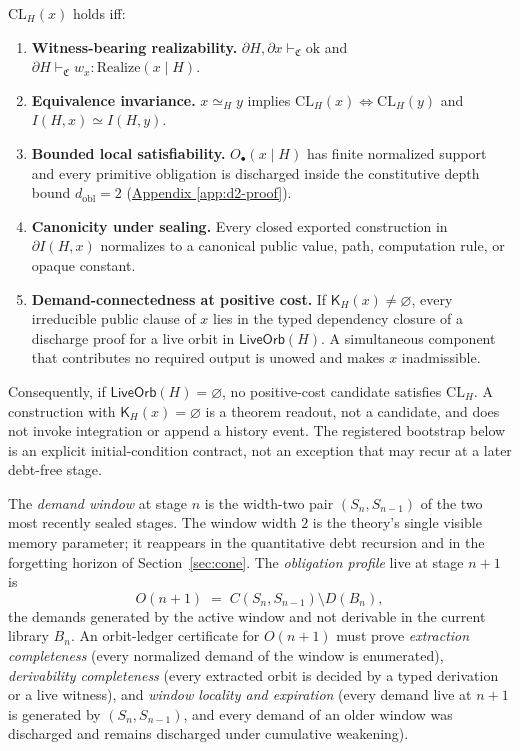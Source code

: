 \begin{definition}
\(\mathrm{CL}_H(x)\) holds iff:
\begin{enumerate}[leftmargin=*, label=\textbf{CL\arabic*.}]
\item \textbf{Witness-bearing realizability.}
\(\partial H,\partial x \vdash_{\mathfrak{C}} \mathrm{ok}\) and
\(\partial H \vdash_{\mathfrak{C}} w_x : \mathrm{Realize}(x\mid H)\).
\item \textbf{Equivalence invariance.} \(x\simeq_H y\) implies
\(\mathrm{CL}_H(x)\Leftrightarrow \mathrm{CL}_H(y)\) and
\(I(H,x)\simeq I(H,y)\).
\item \textbf{Bounded local satisfiability.} \(O_\bullet(x\mid H)\) has finite
normalized support and every primitive obligation is discharged inside the
constitutive depth bound \(d_{\mathrm{obl}}=2\)
(\hyperref[app:d2-proof]{Appendix \ref*{app:d2-proof}}).
\item \textbf{Canonicity under sealing.} Every closed exported construction in
\(\partial I(H,x)\) normalizes to a canonical public value, path, computation
rule, or opaque constant.
\item \textbf{Demand-connectedness at positive cost.} If
\(\mathsf K_H(x)\neq\varnothing\), every irreducible public clause of \(x\)
lies in the typed dependency closure of a discharge proof for a live orbit in
\(\mathsf{LiveOrb}(H)\). A simultaneous component that contributes no
required output is unowed and makes \(x\) inadmissible.
\end{enumerate}
Consequently, if \(\mathsf{LiveOrb}(H)=\varnothing\), no positive-cost
candidate satisfies \(\mathrm{CL}_H\). A construction with
\(\mathsf K_H(x)=\varnothing\) is a theorem readout, not a candidate, and
does not invoke integration or append a history event. The registered
bootstrap below is an explicit initial-condition contract, not an exception
that may recur at a later debt-free stage.
\end{definition}

\begin{definition}
\label{def:demand-window}
The \emph{demand window} at stage \(n\) is the width-two pair
\((S_n,S_{n-1})\) of the two most recently sealed stages. The window width
\(2\) is the theory's single visible memory parameter; it reappears in the
quantitative debt recursion and in the forgetting horizon of
Section~\ref{sec:cone}. The \emph{obligation profile} live at stage \(n+1\) is
\[
O(n+1) \;=\; C(S_n,S_{n-1})\setminus D(B_n),
\]
the demands generated by the active window and not derivable in the current
library \(B_n\). An orbit-ledger certificate for \(O(n+1)\) must prove
\emph{extraction completeness} (every normalized demand of the window is
enumerated), \emph{derivability completeness} (every extracted orbit is
decided by a typed derivation or a live witness), and \emph{window locality
and expiration} (every demand live at \(n+1\) is generated by
\((S_n,S_{n-1})\), and every demand of an older window was discharged and
remains discharged under cumulative weakening).
\end{definition}

